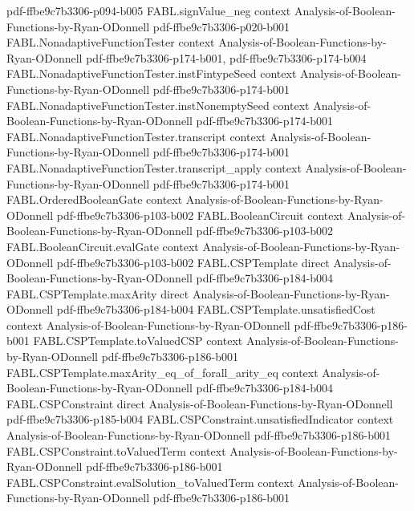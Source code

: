 \begin{theorem}
  {pdf-ffbe9c7b3306-p094-b005}
\proofstep
  {FABL.signValue_neg}
  {context}
  {Analysis-of-Boolean-Functions-by-Ryan-ODonnell}
  {pdf-ffbe9c7b3306-p020-b001}
\proofstep
  {FABL.NonadaptiveFunctionTester}
  {context}
  {Analysis-of-Boolean-Functions-by-Ryan-ODonnell}
  {pdf-ffbe9c7b3306-p174-b001,
    pdf-ffbe9c7b3306-p174-b004}
\proofstep
  {FABL.NonadaptiveFunctionTester.instFintypeSeed}
  {context}
  {Analysis-of-Boolean-Functions-by-Ryan-ODonnell}
  {pdf-ffbe9c7b3306-p174-b001}
\proofstep
  {FABL.NonadaptiveFunctionTester.instNonemptySeed}
  {context}
  {Analysis-of-Boolean-Functions-by-Ryan-ODonnell}
  {pdf-ffbe9c7b3306-p174-b001}
\proofstep
  {FABL.NonadaptiveFunctionTester.transcript}
  {context}
  {Analysis-of-Boolean-Functions-by-Ryan-ODonnell}
  {pdf-ffbe9c7b3306-p174-b001}
\proofstep
  {FABL.NonadaptiveFunctionTester.transcript_apply}
  {context}
  {Analysis-of-Boolean-Functions-by-Ryan-ODonnell}
  {pdf-ffbe9c7b3306-p174-b001}
\proofstep
  {FABL.OrderedBooleanGate}
  {context}
  {Analysis-of-Boolean-Functions-by-Ryan-ODonnell}
  {pdf-ffbe9c7b3306-p103-b002}
\proofstep
  {FABL.BooleanCircuit}
  {context}
  {Analysis-of-Boolean-Functions-by-Ryan-ODonnell}
  {pdf-ffbe9c7b3306-p103-b002}
\proofstep
  {FABL.BooleanCircuit.evalGate}
  {context}
  {Analysis-of-Boolean-Functions-by-Ryan-ODonnell}
  {pdf-ffbe9c7b3306-p103-b002}
\proofstep
  {FABL.CSPTemplate}
  {direct}
  {Analysis-of-Boolean-Functions-by-Ryan-ODonnell}
  {pdf-ffbe9c7b3306-p184-b004}
\proofstep
  {FABL.CSPTemplate.maxArity}
  {direct}
  {Analysis-of-Boolean-Functions-by-Ryan-ODonnell}
  {pdf-ffbe9c7b3306-p184-b004}
\proofstep
  {FABL.CSPTemplate.unsatisfiedCost}
  {context}
  {Analysis-of-Boolean-Functions-by-Ryan-ODonnell}
  {pdf-ffbe9c7b3306-p186-b001}
\proofstep
  {FABL.CSPTemplate.toValuedCSP}
  {context}
  {Analysis-of-Boolean-Functions-by-Ryan-ODonnell}
  {pdf-ffbe9c7b3306-p186-b001}
\proofstep
  {FABL.CSPTemplate.maxArity_eq_of_forall_arity_eq}
  {context}
  {Analysis-of-Boolean-Functions-by-Ryan-ODonnell}
  {pdf-ffbe9c7b3306-p184-b004}
\proofstep
  {FABL.CSPConstraint}
  {direct}
  {Analysis-of-Boolean-Functions-by-Ryan-ODonnell}
  {pdf-ffbe9c7b3306-p185-b004}
\proofstep
  {FABL.CSPConstraint.unsatisfiedIndicator}
  {context}
  {Analysis-of-Boolean-Functions-by-Ryan-ODonnell}
  {pdf-ffbe9c7b3306-p186-b001}
\proofstep
  {FABL.CSPConstraint.toValuedTerm}
  {context}
  {Analysis-of-Boolean-Functions-by-Ryan-ODonnell}
  {pdf-ffbe9c7b3306-p186-b001}
\proofstep
  {FABL.CSPConstraint.evalSolution_toValuedTerm}
  {context}
  {Analysis-of-Boolean-Functions-by-Ryan-ODonnell}
  {pdf-ffbe9c7b3306-p186-b001}

\end{theorem}
